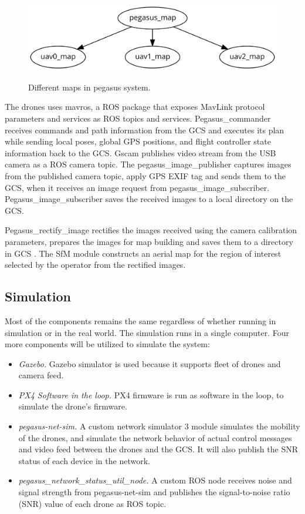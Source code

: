 \begin{figure}
	\centering
	\caption[Different maps in pegasus system.]{\small Different maps in pegasus system.}
	\includegraphics[width=5in]{figures/methodology/map-transformation-heirarichy}
	\label{fig:map-heirarichy}
\end{figure}


The drones uses mavros, a ROS package that exposes MavLink protocol parameters and services as ROS topics and services. Pegasus\_commander receives commands and path information from the GCS and executes its plan while sending local poses, global GPS positions, and flight controller state information back to the GCS. Gscam publishes video stream from the USB camera as a ROS camera topic. The pegasus\_image\_publisher captures images from the published camera topic, apply GPS EXIF tag and sends them to the GCS,  when it receives an image request from pegasus\_image\_subscriber. Pegasus\_image\_subscriber saves the received images to a local directory on the GCS. 

Pegasus\_rectify\_image rectifies the images received using the camera calibration parameters, prepares the images for map building and saves them to a directory in GCS . The SfM module constructs an aerial map for the region of interest selected by the operator from the rectified images.


\subsection{Simulation}

Most of the components remains the same regardless of whether running in simulation or in the real world. The simulation runs in a single computer. Four more components will be utilized to simulate the system:
\begin{itemize}
	\item \textit{Gazebo.} Gazebo simulator is used because it supports fleet of drones and camera feed.
	\item \textit{PX4 Software in the loop.} PX4 firmware is run as software in the loop, to simulate the drone's firmware. 
	\item \textit{pegasus-net-sim.} A custom network simulator 3 module simulates the mobility of the drones, and simulate the network behavior of actual control messages and video feed between the drones and the GCS. It will also publish the SNR status of each device in the network.
	\item \textit{pegasus\_network\_status\_util\_node.} A custom ROS node receives noise and signal strength from pegasus-net-sim and publishes the signal-to-noise ratio (SNR) value of each drone as ROS topic.
\end{itemize}



